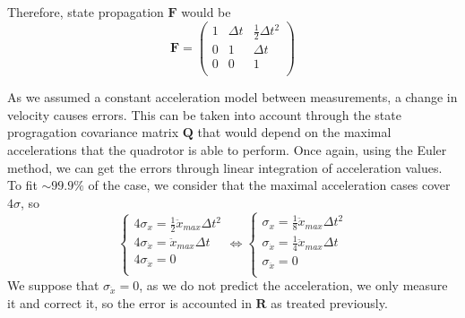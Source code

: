 \documentclass[12pt]{article}
\begin{document}
Therefore, state propagation $\mathbf{F}$ would be
\begin{equation}
\mathbf{F} =
    \begin{pmatrix}
        1 & \Delta{t} & \frac{1}{2}\Delta{t}^2 \\
        0 & 1         & \Delta{t} \\
        0 & 0         & 1 \\
    \end{pmatrix}
\end{equation}

As we assumed a constant acceleration model between measurements, a change in velocity causes errors.
This can be taken into account through the state progragation covariance matrix $\mathbf{Q}$ that would depend on the maximal accelerations that the quadrotor is able to perform.
Once again, using the Euler method, we can get the errors through linear integration of acceleration values.
To fit $\sim 99.9\%$ of the case, we consider that the maximal acceleration cases cover $4\sigma$, so
\begin{equation}
\left\{
    \begin{array}{l}
    4 \sigma_x = \frac{1}{2} \ddot{x}_{max} \Delta{t}^2 \\
    4 \sigma_{\dot{x}} = \ddot{x}_{max} \Delta{t} \\
    4 \sigma_{\ddot{x}} = 0 \\
    \end{array}
\right.
\Leftrightarrow
\left\{
    \begin{array}{l}
    \sigma_x = \frac{1}{8} \ddot{x}_{max} \Delta{t}^2 \\
    \sigma_{\dot{x}} = \frac{1}{4} \ddot{x}_{max} \Delta{t} \\
    \sigma_{\ddot{x}} = 0 \\
    \end{array}
\right.
\end{equation}
We suppose that $\sigma_{\ddot{x}} = 0$, as we do not predict the acceleration, we only measure it and correct it, so the error is accounted in $\mathbf{R}$ as treated previously.
\end{document}

